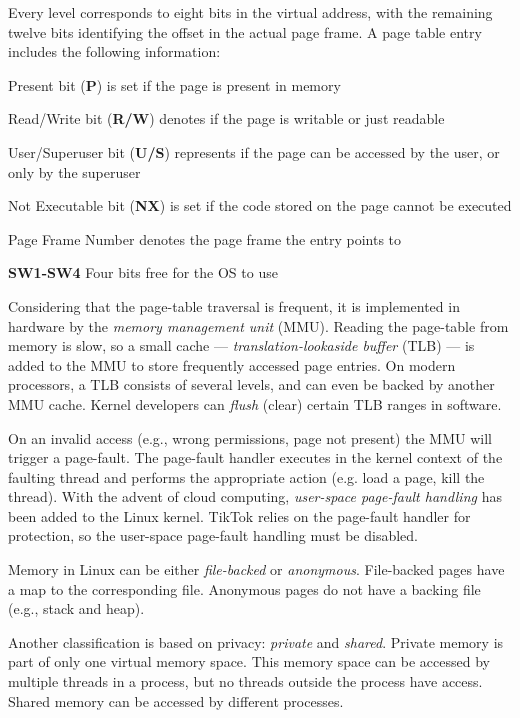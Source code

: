 \documentclass[conference]{IEEEtran}
\newcommand{\sysname}{TikTok}
\begin{document}
Every level corresponds to eight bits in the virtual address, with the remaining twelve
bits identifying the offset in the actual page frame. A page table entry
includes the following information:
\begin{LaTeXdescription}
    \item[Present bit (\textbf{P})] is set if the page is present in memory
    \item[Read/Write bit (\textbf{R/W})] denotes if the page is writable or just
         readable
    \item[User/Superuser bit (\textbf{U/S})] represents if the page can be 
    accessed by the user, or only by the superuser
    \item[Not Executable bit (\textbf{NX})] is set if the code stored on the 
    page cannot be executed
    \item[Page Frame Number] denotes the page frame the entry points to
    \item[\textbf{SW1-SW4}] Four bits free for the OS to use
\end{LaTeXdescription}

Considering that the page-table traversal is frequent, it is implemented in
hardware by the \emph{memory management unit} (MMU). Reading the page-table from
memory is slow, so a small cache --- \emph{translation-lookaside buffer} (TLB)
--- is added to the MMU to store frequently accessed page entries. On modern
processors, a TLB consists of several levels, and can even be backed by another
MMU cache. Kernel developers can \emph{flush} (clear) certain TLB ranges in
software.

On an invalid access (e.g., wrong permissions, page not present) the MMU will
trigger a page-fault. The page-fault handler executes in the kernel context of
the faulting thread and performs the appropriate action (e.g. load a page, kill
the thread). With the advent of cloud computing, \emph{user-space page-fault
handling} has been added to the Linux kernel. \sysname{} relies on the page-fault
handler for protection, so the user-space page-fault handling must be disabled.

Memory in Linux can be either \emph{file-backed} or \emph{anonymous}.
File-backed pages have a map to the corresponding file. Anonymous pages do not
have a backing file (e.g., stack and heap).

Another classification is based on privacy: \emph{private} and \emph{shared}. 
Private memory is part of only one virtual memory space. This memory space can 
be accessed by multiple threads in a process, but no threads outside the process
have access. Shared memory can be accessed by different processes.
\end{document}
